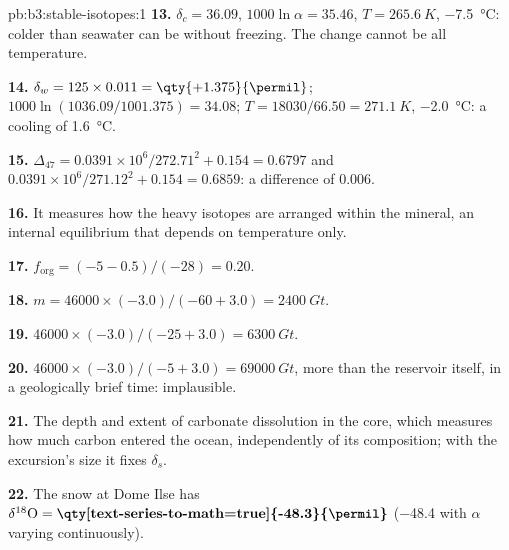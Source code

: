 \begin{solution}{pb:b3:stable-isotopes:1}
\textbf{13.} $\delta_c = 36.09$, $1000\ln\alpha = 35.46$, $T = \qty{265.6}{K}$,
\qty{-7.5}{\celsius}: colder than seawater can be without freezing. The
change cannot be all temperature.

\textbf{14.} $\delta_w = 125\times0.011 = \qty{+1.375}{\permil}$; $1000\ln(1036.09/1001.375)
= 34.08$; $T = 18030/66.50 = \qty{271.1}{K}$, \qty{-2.0}{\celsius}: a cooling of
\qty{1.6}{\celsius}.

\textbf{15.} $\Delta_{47} = 0.0391\times10^6/272.71^2 + 0.154 = 0.6797$ and
$0.0391\times10^6/271.12^2 + 0.154 = 0.6859$: a difference of
\qty{0.006}{\permil}.

\textbf{16.} It measures how the heavy isotopes are arranged within the
mineral, an internal equilibrium that depends on temperature only.

\textbf{17.} $f_{\mathrm{org}} = (-5 - 0.5)/(-28) = 0.20$.

\textbf{18.} $m = 46000\times(-3.0)/(-60 + 3.0) = \qty{2400}{Gt}$.

\textbf{19.} $46000\times(-3.0)/(-25 + 3.0) = \qty{6300}{Gt}$.

\textbf{20.} $46000\times(-3.0)/(-5 + 3.0) = \qty{69000}{Gt}$, more than the
reservoir itself, in a geologically brief time: implausible.

\textbf{21.} The depth and extent of carbonate dissolution in the core, which
measures how much carbon entered the ocean, independently of its composition;
with the excursion's size it fixes $\delta_s$.

\textbf{22.} The snow at Dome Ilse has $\delta^{18}\mathrm O =
\textbf{\qty[text-series-to-math=true]{-48.3}{\permil}} $ (\qty{-48.4}{\permil}
with $\alpha$ varying continuously).
\end{solution}
